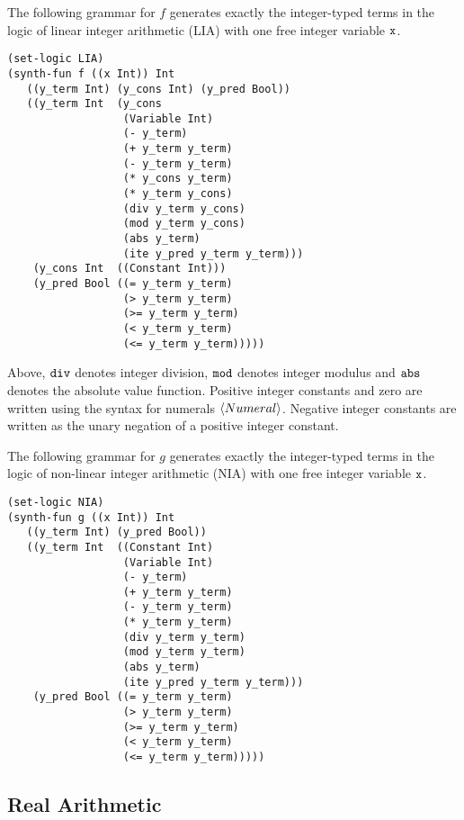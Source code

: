 \documentclass[english,a4paper,10pt]{article}
\begin{document}
\begin{appendix}
The following grammar for $f$
generates exactly the integer-typed terms in the logic of
linear integer arithmetic (LIA) with one free integer variable ${\tt x}$.
\begin{lstlisting}[language=SyGuS]
(set-logic LIA)
(synth-fun f ((x Int)) Int
   ((y_term Int) (y_cons Int) (y_pred Bool))
   ((y_term Int  (y_cons
                  (Variable Int)
                  (- y_term)
                  (+ y_term y_term)
                  (- y_term y_term)
                  (* y_cons y_term)
                  (* y_term y_cons)
                  (div y_term y_cons)
                  (mod y_term y_cons)
                  (abs y_term)
                  (ite y_pred y_term y_term)))
    (y_cons Int  ((Constant Int)))
    (y_pred Bool ((= y_term y_term)
                  (> y_term y_term)
                  (>= y_term y_term)
                  (< y_term y_term)
                  (<= y_term y_term)))))
\end{lstlisting}
Above, ${\tt div}$
denotes integer division,
${\tt mod}$ denotes integer modulus and ${\tt abs}$ denotes
the absolute value function.
Positive integer constants and zero are written using the syntax
for numerals $\left\langle Numeral\right\rangle$. Negative integer constants
are written as the unary negation of a positive integer constant.

The following grammar for $g$ generates exactly the integer-typed terms in the logic of
non-linear integer arithmetic (NIA)
with one free integer variable ${\tt x}$.
\begin{lstlisting}[language=SyGuS]
(set-logic NIA)
(synth-fun g ((x Int)) Int
   ((y_term Int) (y_pred Bool))
   ((y_term Int  ((Constant Int) 
                  (Variable Int)
                  (- y_term)
                  (+ y_term y_term)
                  (- y_term y_term)
                  (* y_term y_term)
                  (div y_term y_term)
                  (mod y_term y_term)
                  (abs y_term)
                  (ite y_pred y_term y_term)))
    (y_pred Bool ((= y_term y_term)
                  (> y_term y_term)
                  (>= y_term y_term)
                  (< y_term y_term)
                  (<= y_term y_term)))))
\end{lstlisting}

\subsection{Real Arithmetic}


\end{appendix}
\end{document}
